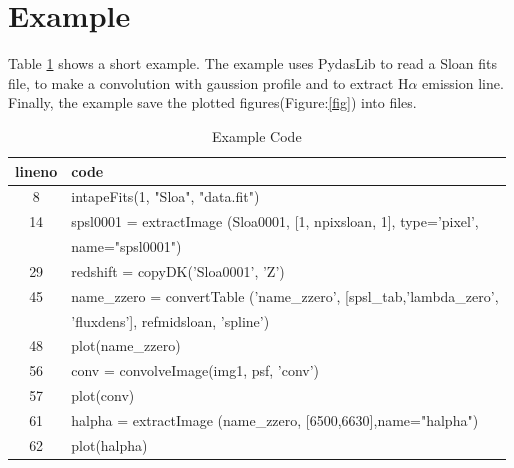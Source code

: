           \section{Example }
Table \ref{code} shows a short example. The example uses PydasLib to read a Sloan fits file, to make a convolution with gaussion profile and to extract H$\alpha$ emission line. Finally, the example save the plotted figures(Figure:\ref{fig}) into files.

\begin{table}[!hb]
\begin{center}
\caption{Example Code}
\label{code}
\begin{tabular}{cl}
lineno & code\\
\hline
8 & intapeFits(1, "Sloa", "data.fit")  \\
14 & spsl0001 = extractImage (Sloa0001, [1, npixsloan, 1], type='pixel', \\
  & name="spsl0001")\\
29 & redshift = copyDK('Sloa0001', 'Z')  \\
45 & name\_zzero = convertTable ('name\_zzero', [spsl\_tab,'lambda\_zero',\\
   & 'fluxdens'], refmidsloan, 'spline')\\
48 & plot(name\_zzero)\\
56 & conv = convolveImage(img1, psf, 'conv') \\
57 & plot(conv)\\
61 & halpha = extractImage (name\_zzero, [6500,6630],name="halpha") \\
62 & plot(halpha)\\
\end{tabular}
\end{center}
\end{table}
	 

